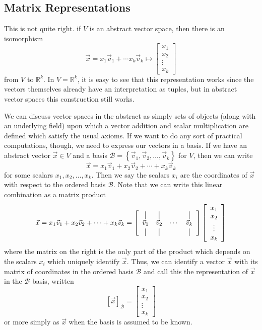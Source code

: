 \subsection{Matrix Representations}
This is not quite right. if $V$ is an abstract vector space, then there is an isomorphism \[ \vec{x} = x_1 \vec{v}_1 + \cdots x_k \vec{v}_k \mapsto \left[ \begin{array}{c} x_1 \\ x_2 \\ \vdots \\ x_k \end{array} \right] \] from $V$ to $\mathbb{R}^k$. In $V=\mathbb{R}^k$, it is easy to see that this representation works since the vectors themselves already have an interpretation as tuples, but in abstract vector spaces this construction still works. 

We can discuss vector spaces in the abstract as simply sets of objects (along with an underlying field) upon which a vector addition and scalar multiplication are defined which satisfy the usual axioms. If we want to do any sort of practical computations, though, we need to express our vectors in a basis. If we have an abstract vector $\vec{x} \in V$ and a basis $\mathcal{B} = \left\{ \vec{v}_1, \vec{v}_2, \ldots, \vec{v}_k \right\}$ for $V$, then we can write \[ \vec{x} = x_1 \vec{v}_1 + x_2 \vec{v}_2 + \cdots + x_k \vec{v}_k \] for some scalars $x_1, x_2,\ldots, x_k$. Then we say the scalars $x_i$ are the coordinates of $\vec{x}$ with respect to the ordered basis $\mathcal{B}$. Note that we can write this linear combination as a matrix product \[ \vec{x} = x_1 \vec{v}_1 + x_2 \vec{v}_2 + \cdots + x_k \vec{v}_k = \left[ \begin{array}{cccc} \vertbar & \vertbar & & \vertbar \\ \vec{v}_1 & \vec{v}_2 & \cdots & \vec{v}_k \\ \vertbar & \vertbar & & \vertbar \end{array} \right] \left[ \begin{array}{c} x_1 \\ x_2 \\ \vdots \\ x_k \end{array} \right] \] where the matrix on the right is the only part of the product which depends on the scalars $x_i$ which uniquely identify $\vec{x}$. Thus, we can identify a vector $\vec{x}$ with its matrix of coordinates in the ordered basis $\mathcal{B}$ and call this the representation of $\vec{x}$ in the $\mathcal{B}$ basis, written \[ \left[ \vec{x} \right]_{\mathcal{B}} = \left[ \begin{array}{c} x_1 \\ x_2 \\ \vdots \\ x_k \end{array} \right] \] or more simply as $\vec{x}$ when the basis is assumed to be known.

